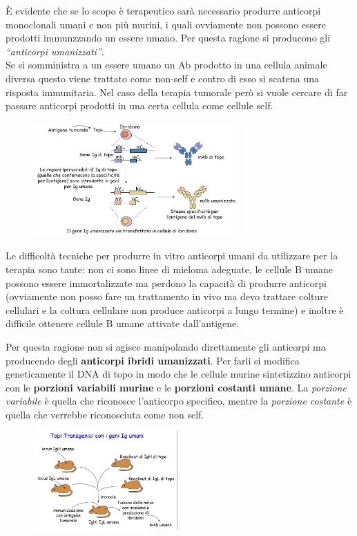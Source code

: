 \documentclass[11pt]{book}
\begin{document}
È evidente che se lo scopo è terapeutico sarà necessario produrre anticorpi monoclonali umani e non più murini, i quali ovviamente non possono essere prodotti immunzzando un essere umano. Per questa ragione si producono gli \emph{``anticorpi umanizzati''}.\\
Se si somministra a un essere umano un Ab prodotto in una cellula animale diversa questo viene trattato come non-self e contro di esso si scatena una risposta immunitaria.
Nel caso della terapia tumorale però si vuole cercare di far passare anticorpi prodotti in una certa cellula come cellule self.

\begin{figure}
    \includegraphics[width=0.7\textwidth]{img/30_ig_umanizzate.png}
  \caption{}
\end{figure}

Le difficoltà tecniche per produrre in vitro anticorpi umani da utilizzare per la terapia sono tante: non ci sono linee di mieloma adeguate, le cellule B umane possono essere immortalizzate ma perdono la capacità di produrre anticorpi (ovviamente non posso fare un trattamento in vivo ma devo trattare colture cellulari e la coltura cellulare non produce anticorpi a lungo termine) e inoltre è difficile ottenere cellule B umane attivate dall’antigene.

Per questa ragione non si agisce manipolando direttamente gli anticorpi ma producendo degli \textbf{anticorpi ibridi umanizzati}.
Per farli si modifica geneticamente il DNA di topo in modo che le cellule murine sintetizzino anticorpi con le \textbf{porzioni variabili murine} e le \textbf{porzioni costanti umane}.
La \emph{porzione variabile} è quella che riconosce l’anticorpo specifico, mentre la \emph{porzione costante} è quella che verrebbe riconosciuta come non self.

\begin{figure}
    \includegraphics[width=0.50\textwidth]{img/31_topi_transgenici.png}
  \caption{}
\end{figure}
\end{document}
